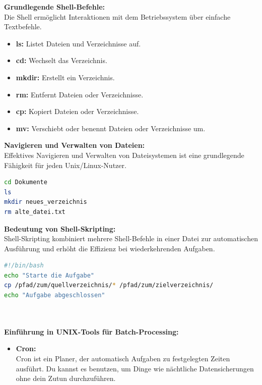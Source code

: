 \documentclass[9pt]{innovativeinnovation-cheatsheet}
\begin{document}
\begin{multicols*}{4}
\textbf{Grundlegende Shell-Befehle:} \ \\
Die Shell ermöglicht Interaktionen mit dem Betriebssystem über einfache Textbefehle. 

\begin{itemize}
	\item \textbf{ls:} Listet Dateien und Verzeichnisse auf.
	\item \textbf{cd:} Wechselt das Verzeichnis.
	\item \textbf{mkdir:} Erstellt ein Verzeichnis.
	\item \textbf{rm:} Entfernt Dateien oder Verzeichnisse.
	\item \textbf{cp:} Kopiert Dateien oder Verzeichnisse.
	\item \textbf{mv:} Verschiebt oder benennt Dateien oder Verzeichnisse um.
\end{itemize}

\textbf{Navigieren und Verwalten von Dateien:} \ \\
Effektives Navigieren und Verwalten von Dateisystemen ist eine grundlegende Fähigkeit für jeden Unix/Linux-Nutzer.

\begin{lstlisting}[language=bash, numbers=none]
cd Dokumente
ls
mkdir neues_verzeichnis
rm alte_datei.txt
\end{lstlisting}



\textbf{Bedeutung von Shell-Skripting:} \\
Shell-Skripting kombiniert mehrere Shell-Befehle in einer Datei zur automatischen Ausführung und erhöht die Effizienz bei wiederkehrenden Aufgaben.

\begin{lstlisting}[language=bash, numbers=none]
#!/bin/bash
echo "Starte die Aufgabe"
cp /pfad/zum/quellverzeichnis/* /pfad/zum/zielverzeichnis/
echo "Aufgabe abgeschlossen"
\end{lstlisting}

 \ \\ \\
\textbf{Einführung in UNIX-Tools für Batch-Processing:}
\begin{itemize}
	\item \textbf{Cron:} \\ Cron ist ein Planer, der automatisch Aufgaben zu festgelegten Zeiten ausführt. Du kannst es benutzen, um Dinge wie nächtliche Datensicherungen ohne dein Zutun durchzuführen.
	

\end{itemize}
\end{multicols*}
\end{document}
